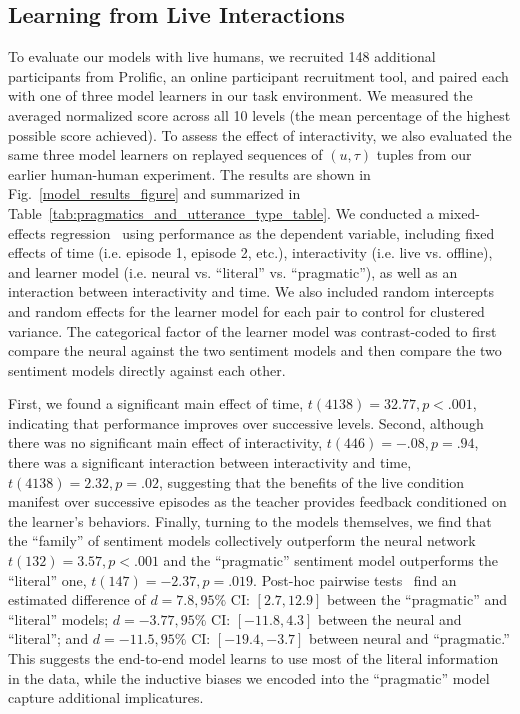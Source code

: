 \documentclass[letterpaper]{article} %
\begin{document}
\subsection{Learning from Live Interactions}
\label{dyad_trajectory_comparison}

To evaluate our models with live humans, we recruited 148 additional participants from Prolific, an online participant recruitment tool, and paired each with one of three model learners in our task environment. We measured the averaged normalized score across all 10 levels (the mean percentage of the highest possible score achieved).
To assess the effect of interactivity, we also evaluated the same three model learners on replayed sequences of $(u,\tau)$ tuples from our earlier human-human experiment. The results are shown in Fig.~\ref{model_results_figure} and summarized in Table~\ref{tab:pragmatics_and_utterance_type_table}.
We conducted a mixed-effects regression~\cite{kuznetsova2017lmertest} using performance as the dependent variable, including fixed effects of time (i.e. episode 1, episode 2, etc.), interactivity (i.e. live vs. offline), and learner model (i.e. neural vs. ``literal'' vs. ``pragmatic''), as well as an interaction between interactivity and time.
We also included random intercepts and random effects for the learner model for each pair to control for clustered variance.
The categorical factor of the learner model was contrast-coded to first compare the neural against the two sentiment models and then compare the two sentiment models directly against each other.

First, we found a significant main effect of time, $t(4138)=32.77, p<.001$, indicating that performance improves over successive levels.
Second, although there was no significant main effect of interactivity, $t(446)=-.08, p=.94$, there was a significant interaction between  interactivity and time, $t(4138)=2.32, p=.02$, suggesting that the benefits of the live condition manifest over successive episodes as the teacher provides feedback conditioned on the learner's behaviors.
Finally, turning to the models themselves, we find that the ``family'' of sentiment models collectively outperform the neural network $t(132)=3.57, p<.001$ and the ``pragmatic'' sentiment model outperforms the ``literal'' one, $t(147)=-2.37, p=.019$.
Post-hoc pairwise tests~\cite{tukey1953section} find an estimated difference of $d = 7.8, 95\%$ CI: $[2.7, 12.9]$ between the ``pragmatic'' and ``literal'' models; $d = -3.77, 95\%$ CI: $[-11.8, 4.3]$ between the neural and ``literal''; and $d = -11.5, 95\%$ CI: $[-19.4, -3.7]$ between neural and ``pragmatic.''
This suggests the end-to-end model learns to use most of the literal information in the data, while the inductive biases we encoded into the ``pragmatic'' model capture additional implicatures.
\end{document}
